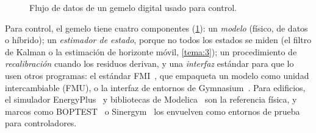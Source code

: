 \begin{figure}[h]
\centering
{}
\caption{Flujo de datos de un gemelo digital usado para control.}
\label{fig:gemelo}
\end{figure}

Para control, el gemelo tiene cuatro componentes (\cref{fig:gemelo}): un \emph{modelo} (físico, de datos o híbrido); un \emph{estimador de estado}, porque no todos los estados se miden (el filtro de Kalman o la estimación de horizonte móvil, \cref{tema:3}); un procedimiento de \emph{recalibración} cuando los residuos derivan, y una \emph{interfaz} estándar para que lo usen otros programas: el estándar FMI~\cite{fmi}, que empaqueta un modelo como unidad intercambiable (FMU), o la interfaz de entornos de Gymnasium~\cite{gymnasium}. Para edificios, el simulador EnergyPlus~\cite{crawley} y bibliotecas de Modelica~\cite{modelica} son la referencia física, y marcos como BOPTEST~\cite{boptest} o Sinergym~\cite{sinergym} los envuelven como entornos de prueba para controladores.

